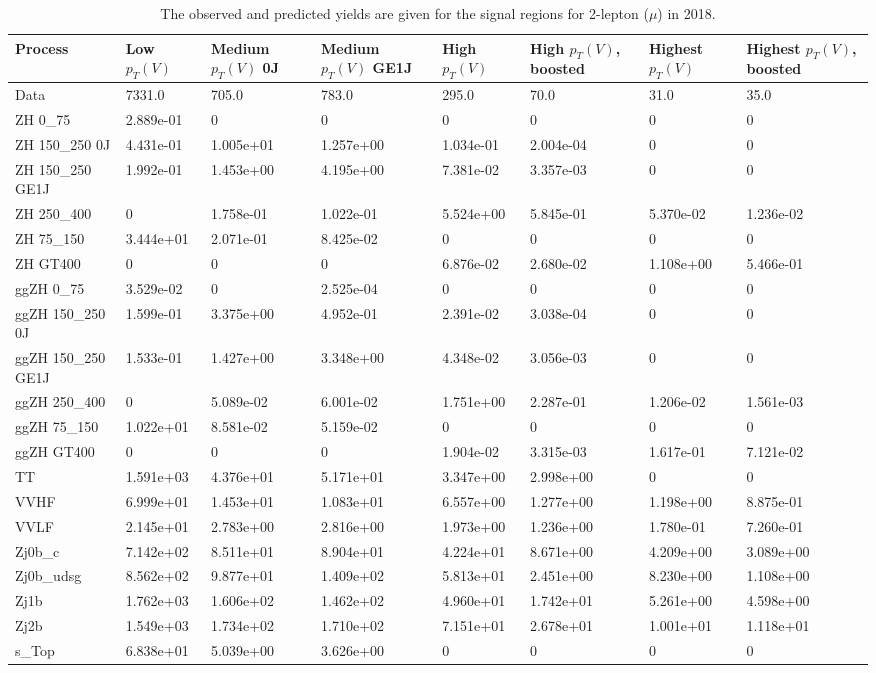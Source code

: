 \begin{table}
\centering
\caption[2018 2-lepton ($\mu$) signal selection yields]{
                  The observed and predicted yields are given for the
                  signal regions for 2-lepton ($\mu$) in 2018.
                  }
{\footnotesize
\begin{tabularx}{\textwidth}{|X|X|X|X|X|X|X|X|}
\hline
Process & Low $p_{T}(V)$ & Medium $p_{T}(V)$ 0J & Medium $p_{T}(V)$ GE1J & High $p_{T}(V)$ & High $p_{T}(V)$, boosted & Highest $p_{T}(V)$ & Highest $p_{T}(V)$, boosted \\
\hline
Data & 7331.0 & 705.0 & 783.0 & 295.0 & 70.0 & 31.0 & 35.0 \\
\hline
ZH 0\_75 & 2.889e-01 & 0 & 0 & 0 & 0 & 0 & 0 \\
ZH 150\_250 0J & 4.431e-01 & 1.005e+01 & 1.257e+00 & 1.034e-01 & 2.004e-04 & 0 & 0 \\
ZH 150\_250 GE1J & 1.992e-01 & 1.453e+00 & 4.195e+00 & 7.381e-02 & 3.357e-03 & 0 & 0 \\
ZH 250\_400 & 0 & 1.758e-01 & 1.022e-01 & 5.524e+00 & 5.845e-01 & 5.370e-02 & 1.236e-02 \\
ZH 75\_150 & 3.444e+01 & 2.071e-01 & 8.425e-02 & 0 & 0 & 0 & 0 \\
ZH GT400 & 0 & 0 & 0 & 6.876e-02 & 2.680e-02 & 1.108e+00 & 5.466e-01 \\
ggZH 0\_75 & 3.529e-02 & 0 & 2.525e-04 & 0 & 0 & 0 & 0 \\
ggZH 150\_250 0J & 1.599e-01 & 3.375e+00 & 4.952e-01 & 2.391e-02 & 3.038e-04 & 0 & 0 \\
ggZH 150\_250 GE1J & 1.533e-01 & 1.427e+00 & 3.348e+00 & 4.348e-02 & 3.056e-03 & 0 & 0 \\
ggZH 250\_400 & 0 & 5.089e-02 & 6.001e-02 & 1.751e+00 & 2.287e-01 & 1.206e-02 & 1.561e-03 \\
ggZH 75\_150 & 1.022e+01 & 8.581e-02 & 5.159e-02 & 0 & 0 & 0 & 0 \\
ggZH GT400 & 0 & 0 & 0 & 1.904e-02 & 3.315e-03 & 1.617e-01 & 7.121e-02 \\
\hline
TT & 1.591e+03 & 4.376e+01 & 5.171e+01 & 3.347e+00 & 2.998e+00 & 0 & 0 \\
VVHF & 6.999e+01 & 1.453e+01 & 1.083e+01 & 6.557e+00 & 1.277e+00 & 1.198e+00 & 8.875e-01 \\
VVLF & 2.145e+01 & 2.783e+00 & 2.816e+00 & 1.973e+00 & 1.236e+00 & 1.780e-01 & 7.260e-01 \\
Zj0b\_c & 7.142e+02 & 8.511e+01 & 8.904e+01 & 4.224e+01 & 8.671e+00 & 4.209e+00 & 3.089e+00 \\
Zj0b\_udsg & 8.562e+02 & 9.877e+01 & 1.409e+02 & 5.813e+01 & 2.451e+00 & 8.230e+00 & 1.108e+00 \\
Zj1b & 1.762e+03 & 1.606e+02 & 1.462e+02 & 4.960e+01 & 1.742e+01 & 5.261e+00 & 4.598e+00 \\
Zj2b & 1.549e+03 & 1.734e+02 & 1.710e+02 & 7.151e+01 & 2.678e+01 & 1.001e+01 & 1.118e+01 \\
s\_Top & 6.838e+01 & 5.039e+00 & 3.626e+00 & 0 & 0 & 0 & 0 \\
\hline
\end{tabularx}
}
\label{tab:sr-Zmm-2018}
\end{table}

